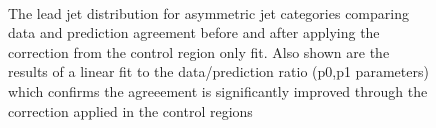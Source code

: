 \begin{figure}[tbhp]
    \begin{center}
         ~~
        \\
        \caption{The lead jet \pt distribution for asymmetric jet categories comparing data and prediction agreement before and after applying the correction from the control region only fit. Also shown are the results of a linear fit to the data/prediction ratio (p0,p1 parameters) which confirms the agreeement is significantly improved through the correction applied in the control regions}
    \end{center}
\end{figure}
